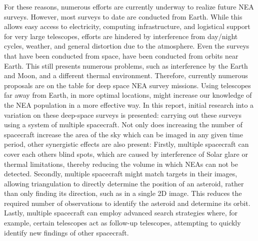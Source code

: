 For these reasons, numerous efforts are currently underway to realize future NEA surveys. However, most surveys to date are conducted from Earth. While this allows easy access to electricity, computing infrastructure, and logistical support for very large telescopes, efforts are hindered by interference from day/night cycles, weather, and general distortion due to the atmosphere. Even the surveys that have been conducted from space, have been conducted from orbits near Earth. This still presents numerous problems, such as interference by the Earth and Moon, and a different thermal environment. Therefore, currently numerous proposals are on the table for deep space NEA survey missions. Using telescopes far away from Earth, in more optimal locations, might increase our knowledge of the NEA population in a more effective way. In this report, initial research into a variation on these deep-space surveys is presented: carrying out these surveys using a system of multiple spacecraft. Not only does increasing the number of spacecraft increase the area of the sky which can be imaged in any given time period, other synergistic effects are also present: Firstly, multiple spacecraft can cover each others blind spots, which are caused by interference of Solar glare or thermal limitations, thereby reducing the volume in which NEAs can not be detected. Secondly, multiple spacecraft might match targets in their images, allowing triangulation to directly determine the position of an asteroid, rather than only finding its direction, such as in a single 2D image. This reduces the required number of observations to identify the asteroid and determine its orbit. Lastly, multiple spacecraft can employ advanced search strategies where, for example, certain telescopes act as follow-up telescopes, attempting to quickly identify new findings of other spacecraft. \\

